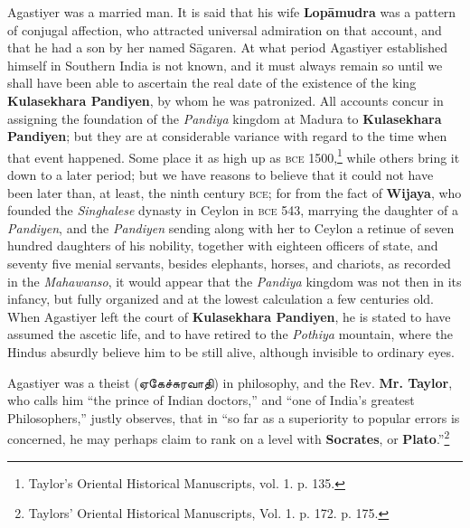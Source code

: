 \documentclass{article}
\newcommand{\TamilText}[1]{\texttamil{#1}}
\newcommand{\tam}[1]{\TamilText{#1}}
\begin{document}
Agastiyer was a married man. It is said that his wife \textbf{Lop\={a}mudra} was a pattern of conjugal affection, who attracted universal admiration on that account, and that he had a son by her named S\={a}garen. At what period Agastiyer established himself in Southern India is not known, and it must always remain so until we shall have been able to ascertain the real date of the existence of the king \textbf{Kulasekhara Pandiyen}, by whom he was patronized. All accounts concur in assigning the foundation of the \emph{Pandiya} kingdom at Madura to \textbf{Kulasekhara Pandiyen}; but they are at considerable variance with regard to the time when that event happened. Some place it as high up as \textsc{bce} 1500,\footnote{Taylor's Oriental Historical Manuscripts, vol. 1. p. 135.} while others bring it down to a later period; but we have reasons to believe that it could not have been later than, at least, the ninth century \textsc{bce}; for from the fact of \textbf{Wijaya}, who founded the \emph{Singhalese} dynasty in Ceylon in \textsc{bce} 543, marrying the daughter of a \emph{Pandiyen}, and the \emph{Pandiyen} sending along with her to Ceylon a retinue of seven hundred daughters of his nobility, together with eighteen officers of state, and seventy five menial servants, besides elephants, horses, and chariots, as recorded in the \emph{Mahawanso}, it would appear that the \emph{Pandiya} kingdom was not then in its infancy, but fully organized and at the lowest calculation a few centuries old. When Agastiyer left the court of \textbf{Kulasekhara Pandiyen}, he is stated to have assumed the ascetic life, and to have retired to the \emph{Pothiya} mountain, where the Hindus absurdly believe him to be still alive, although invisible to ordinary eyes.

Agastiyer was a theist (\tam{ஏகேச்சுரவாதி}) in philosophy, and the Rev. \textbf{Mr. Taylor}, who calls him ``the prince of Indian doctors,'' and ``one of India's greatest Philosophers,'' justly observes, that in ``so far as a superiority to popular errors is concerned, he may perhaps claim to rank on a level with \textbf{Socrates}, or \textbf{Plato}.''\footnote{Taylors' Oriental Historical Manuscripts, Vol. 1. p. 172. p. 175.}
\end{document}
